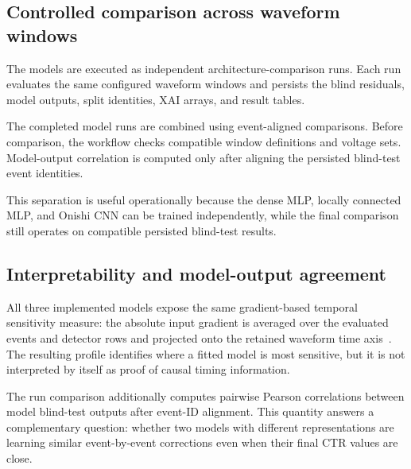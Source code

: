 \subsection{Controlled comparison across waveform windows}

The models are executed as independent architecture-comparison runs. Each run evaluates the same configured waveform windows and persists the blind residuals, model outputs, split identities, XAI arrays, and result tables.

The completed model runs are combined using event-aligned comparisons. Before comparison, the workflow checks compatible window definitions and voltage sets. Model-output correlation is computed only after aligning the persisted blind-test event identities.

This separation is useful operationally because the dense MLP, locally connected MLP, and Onishi CNN can be trained independently, while the final comparison still operates on compatible persisted blind-test results.

\subsection{Interpretability and model-output agreement}

All three implemented models expose the same gradient-based temporal sensitivity measure: the absolute input gradient is averaged over the evaluated events and detector rows and projected onto the retained waveform time axis~\cite{simonyan2014}. The resulting profile identifies where a fitted model is most sensitive, but it is not interpreted by itself as proof of causal timing information.

The run comparison additionally computes pairwise Pearson correlations between model blind-test outputs after event-ID alignment. This quantity answers a complementary question: whether two models with different representations are learning similar event-by-event corrections even when their final CTR values are close.
